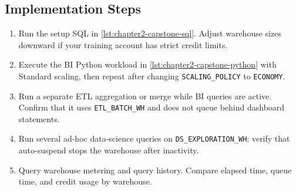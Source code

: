 \subsection*{Implementation Steps}
\begin{enumerate}
    \item Run the setup SQL in \cref{lst:chapter2-capstone-sql}. Adjust warehouse sizes downward if your training account has strict credit limits.
    \item Execute the BI Python workload in \cref{lst:chapter2-capstone-python} with Standard scaling, then repeat after changing \texttt{SCALING\_POLICY} to \texttt{ECONOMY}.
    \item Run a separate ETL aggregation or merge while BI queries are active. Confirm that it uses \texttt{ETL\_BATCH\_WH} and does not queue behind dashboard statements.
    \item Run several ad-hoc data-science queries on \texttt{DS\_EXPLORATION\_WH}; verify that auto-suspend stops the warehouse after inactivity.
    \item Query warehouse metering and query history. Compare elapsed time, queue time, and credit usage by warehouse.
\end{enumerate}

